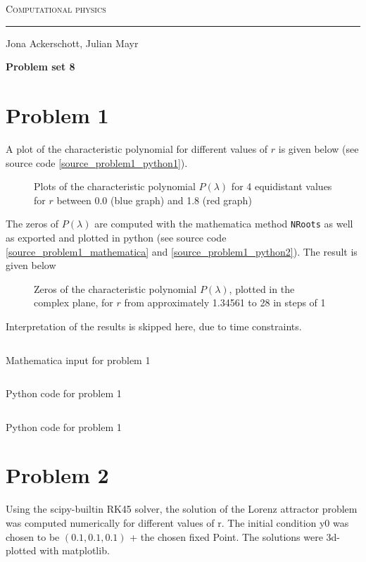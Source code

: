 \documentclass[12pt, a4paper]{article}
\begin{document}
  \centerline{\Huge\scshape Computational physics}
  \vspace*{0.5cm}
  \hrule
  \vspace*{0.5cm}
  \centerline{Jona Ackerschott, Julian Mayr}
  \vspace*{1cm}
  \centerline{\Large\bfseries Problem set 8}
  \vspace*{0.5cm}

  \section*{Problem 1}
  A plot of the characteristic polynomial for different values of $r$ is given below (see source code \ref{source_problem1_python1}).
  \begin{figure}[h]
    \centering
    \resizebox{\textwidth}{!}{
      
    }
    \caption{Plots of the characteristic polynomial $P(\lambda)$ for 4 equidistant values for $r$ between 0.0 (blue graph) and 1.8 (red graph)}
  \end{figure}

  The zeros of $P(\lambda)$ are computed with the mathematica method \texttt{NRoots} as well as exported and plotted in python (see source code \ref{source_problem1_mathematica} and \ref{source_problem1_python2}). The result is given below

  \begin{figure}[h]
    \centering
    \resizebox{\textwidth}{!}{
      
    }
    \caption{Zeros of the characteristic polynomial $P(\lambda)$, plotted in the complex plane, for $r$ from approximately 1.34561 to 28 in steps of 1}
  \end{figure}

  Interpretation of the results is skipped here, due to time constraints.

  \newpage
  \captionsetup{type=listing}
  \inputminted{mathematica}{problem1.txt}
  \caption{Mathematica input for problem 1}
  \label{source_problem1_mathematica}

  \captionsetup{type=listing}
  \inputminted{python}{problem11.py}
  \caption{Python code for problem 1}
  \label{source_problem1_python1}

  \captionsetup{type=listing}
  \inputminted{python}{problem12.py}
  \caption{Python code for problem 1}
  \label{source_problem1_python2}

  \newpage
  \section*{Problem 2}
  Using the scipy-builtin RK45 solver, the solution of the Lorenz attractor problem was computed numerically for different values of r. The initial condition y0 was chosen to be $(0.1, 0.1, 0.1)$ + the chosen fixed Point. The solutions were 3d-plotted with matplotlib.
  
\end{document}
